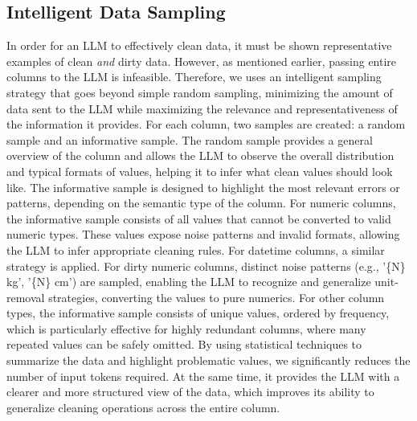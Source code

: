 \subsection{Intelligent Data Sampling}
In order for an LLM to effectively clean data, it must be shown representative examples of clean \emph{and} dirty data. 
However, as mentioned earlier, passing entire columns to the LLM is infeasible. 
Therefore, we uses an intelligent sampling strategy that goes beyond simple random sampling, minimizing the amount of data sent to the LLM while maximizing the relevance and representativeness of the information it provides.
\newline\newline
For each column, two samples are created: a random sample and an informative sample. 
The random sample provides a general overview of the column and allows the LLM to observe the overall distribution and typical formats of values, helping it to infer what clean values should look like.
The informative sample is designed to highlight the most relevant errors or patterns, depending on the semantic type of the column.
For numeric columns, the informative sample consists of all values that cannot be converted to valid numeric types. 
These values expose noise patterns and invalid formats, allowing the LLM to infer appropriate cleaning rules. 
For datetime columns, a similar strategy is applied. 
For dirty numeric columns, distinct noise patterns (e.g., '\{N\} kg', '\{N\} cm') are sampled, enabling the LLM to recognize and generalize unit-removal strategies, converting the values to pure numerics. 
For other column types, the informative sample consists of unique values, ordered by frequency, which is particularly effective for highly redundant columns, where many repeated values can be safely omitted.
\newline\newline
By using statistical techniques to summarize the data and highlight problematic values, we significantly reduces the number of input tokens required. 
At the same time, it provides the LLM with a clearer and more structured view of the data, which improves its ability to generalize cleaning operations across the entire column.

